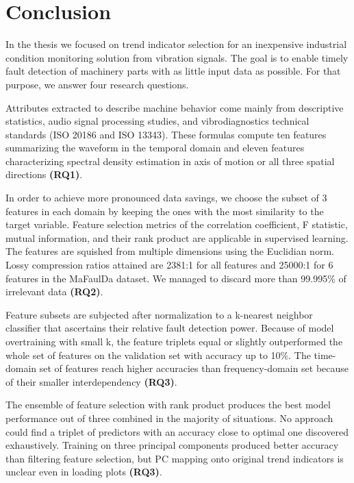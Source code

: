 \chapter{Conclusion} \label{section:conclusion}  
In the thesis we focused on trend indicator selection for an inexpensive industrial condition monitoring solution from vibration signals. The goal is to enable timely fault detection of machinery parts with as little input data as possible. For that purpose, we answer four research questions.

Attributes extracted to describe machine behavior come mainly from descriptive statistics, audio signal processing studies, and vibrodiagnostics technical standards (ISO 20186 and ISO 13343). These formulas compute ten features summarizing the waveform in the temporal domain and eleven features characterizing spectral density estimation in axis of motion or all three spatial directions \textbf{(RQ1)}.

In order to achieve more pronounced data savings, we choose the subset of 3 features in each domain by keeping the ones with the most similarity to the target variable. Feature selection metrics of the correlation coefficient, F statistic, mutual information, and their rank product are applicable in supervised learning. The features are squished from multiple dimensions using the Euclidian norm. Lossy compression ratios attained are 2381:1 for all features and 25000:1 for 6 features in the MaFaulDa dataset. We managed to discard more than 99.995\% of irrelevant data \textbf{(RQ2)}.

Feature subsets are subjected after normalization to a k-nearest neighbor classifier that ascertains their relative fault detection power. Because of model overtraining with small k, the feature triplets equal or slightly outperformed the whole set of features on the validation set with accuracy up to 10\%. The time-domain set of features reach higher accuracies than frequency-domain set because of their smaller interdependency \textbf{(RQ3)}. 

The ensemble of feature selection with rank product produces the best model performance out of three combined in the majority of situations. No approach could find a triplet of predictors with an accuracy close to optimal one discovered exhaustively. 
Training on three principal components produced better accuracy than filtering feature selection, but PC mapping onto original trend indicators is unclear even in loading plots \textbf{(RQ3)}.


